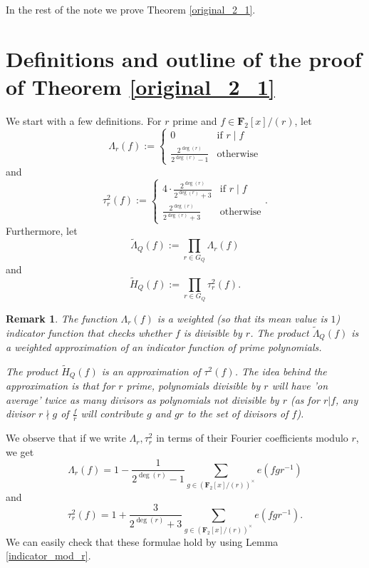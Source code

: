 \documentclass[11pt, reqno]{amsart}
\newtheorem*{remark}{Remark}
\numberwithin{equation}{section}
\newcommand{\zff}{\mathbf{F}_2[x]}
\newcommand{\zffmi}[1]{(\zff/(#1))^{\times}}
\newcommand{\zffmodinv}{\zffmi{r}}
\begin{document}
In the rest of the note we prove Theorem \ref{original_2_1}.

\section{Definitions and outline of the proof of Theorem \ref{original_2_1}}
\label{main_section}

We start with a few definitions. For $r$ prime and $f \in \zff / (r)$, let
\begin{equation}
    \Lambda_r(f) := \begin{cases}
    0 & \text{if } r \mid f\\
    \frac{2^{\deg(r)}}{2^{\deg(r)} - 1} & \text{otherwise}
\end{cases}
\end{equation}
and
\begin{equation}
    \tau^2_r(f) := \begin{cases}
    4 \cdot \frac{2^{\deg(r)}}{2^{\deg(r)} + 3} & \text{if } r \mid f\\
    \frac{2^{\deg(r)}}{2^{\deg(r)} + 3} & \text{otherwise}
\end{cases}.
\end{equation}
Furthermore, let
\begin{equation}
    \widetilde{\Lambda}_Q(f) := \prod_{r \in G_Q} \Lambda_r(f)
\end{equation}
and
\begin{equation}
    \widetilde{H}_Q(f) := \prod_{r \in G_Q} \tau^2_r(f).
\end{equation}

\begin{remark}
\normalfont
    The function $\Lambda_r(f)$ is a weighted (so that its mean value is $1$) indicator function that checks whether $f$ is divisible by $r$. The product $\widetilde{\Lambda}_Q(f)$ is a weighted approximation of an indicator function of prime polynomials.

    The product $\widetilde{H}_Q(f)$ is an approximation of $\tau^2(f)$. The idea behind the approximation is that for $r$ prime, polynomials divisible by $r$ will have 'on average' twice as many divisors as polynomials not divisible by $r$ (as for $r | f$, any divisor $r \nmid g$ of $\frac{f}{r}$ will contribute $g$ and $gr$ to the set of divisors of $f$). 
\end{remark}

We observe that if we write $\Lambda_r, \tau^2_r$ in terms of their Fourier coefficients modulo $r$, we get
\begin{equation}
    \Lambda_r(f) = 1 - \frac{1}{2^{\deg(r)} - 1} \sum_{g \in \zffmodinv} e(fgr^{-1})
\end{equation}
and
\begin{equation}
    \tau^2_r(f)=1 + \frac{3}{2^{\deg(r)} + 3} \sum_{g \in \zffmodinv} e(fgr^{-1}).
\end{equation}
We can easily check that these formulae hold by using Lemma \ref{indicator_mod_r}.
\end{document}
